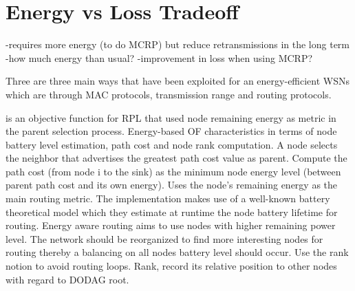 \chapter{Energy vs Loss Tradeoff}
\label{energyLoss}

-requires more energy (to do MCRP) but reduce retransmissions in the long term
-how much energy than usual?
-improvement in loss when using MCRP?

Three are three main ways that have been exploited for an energy-efficient WSNs which are through MAC protocols, transmission range and routing protocols.

\cite{energyrpl} is an objective function for RPL that used node remaining energy as metric in the parent selection process. Energy-based OF characteristics in terms of node battery level estimation, path cost and node rank computation. A node selects the neighbor that advertises the greatest path cost value as parent. Compute the path cost (from node i to the sink) as the minimum node energy level (between parent path cost and its own energy). Uses the node's remaining energy as the main routing metric. The implementation makes use of a well-known battery theoretical model which they estimate at runtime the node battery lifetime for routing. Energy aware routing aims to use nodes with higher remaining power level. The network should be reorganized to find more interesting nodes for routing thereby a balancing on all nodes battery level should occur. Use the rank notion to avoid routing loops. Rank, record its relative position to other nodes with regard to DODAG root. 